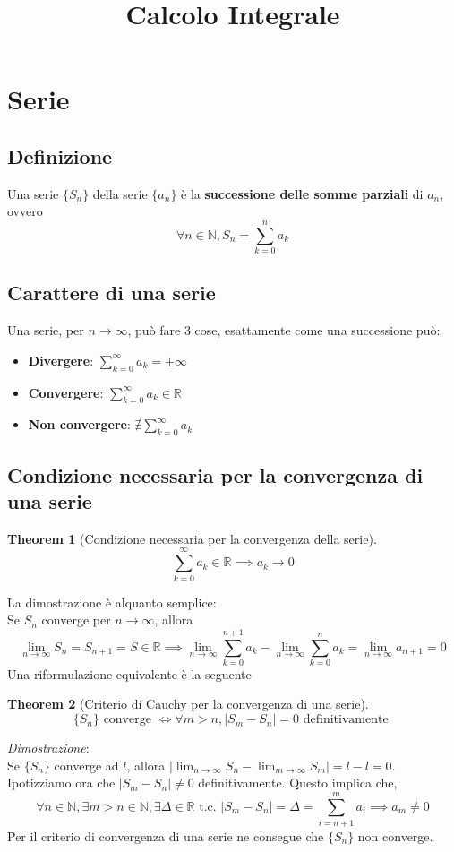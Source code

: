 \documentclass{article}
\newtheorem{theorem}{Theorem}[section]
\begin{document}
\title{Calcolo Integrale}
\maketitle
\section{Serie}
    \subsection{Definizione}
        Una serie $\{S_n\}$ della serie $\{a_n\}$ è la \textbf{successione delle somme parziali} 
        di $a_n$, ovvero 
        $$\forall n \in \mathbb{N}, S_n = \sum_{k=0}^n a_k$$
    \subsection{Carattere di una serie}
        Una serie, per $n \to \infty$, può fare 3 cose, esattamente come una successione può:
        \begin{itemize}
            \item \textbf{Divergere}: $\sum_{k=0}^\infty a_k = \pm \infty$
            \item \textbf{Convergere}: $\sum_{k=0}^\infty a_k \in \mathbb{R}$
            \item \textbf{Non convergere}: $\nexists \sum_{k=0}^\infty a_k$
        \end{itemize}
    \subsection{Condizione necessaria per la convergenza di una serie}
        \begin{theorem}[Condizione necessaria per la convergenza della serie]
            $$\sum_{k=0}^\infty a_k \in \mathbb{R} \implies a_k \to 0$$
        \end{theorem}
        La dimostrazione è alquanto semplice: \\
        Se $S_n$ converge per $n \to \infty$, allora 
        $$\lim_{n \to \infty} S_n = S_{n+1} = S \in \mathbb{R} \implies 
            \lim_{n \to \infty} \sum_{k=0}^{n+1} a_k - \lim_{n \to \infty} \sum_{k=0}^{n} a_k = 
            \lim_{n \to \infty} a_{n+1} = 0
        $$
        Una riformulazione equivalente è la seguente
        \begin{theorem}[Criterio di Cauchy per la convergenza di una serie] 
            $$\{S_n\} \textrm{ converge } \iff \forall m > n, |S_m - S_n| = 0 \textrm{ definitivamente }$$
        \end{theorem}
        \textit{Dimostrazione}: \\
            Se $\{S_n\}$ converge ad $l$, allora $|\lim_{n \to \infty} S_n - \lim_{m \to \infty} S_m| = l - l = 0$. \\
            Ipotizziamo ora che $|S_m - S_n| \neq 0$ definitivamente. Questo implica che, 
            $$\forall n \in \mathbb{N}, \exists m > n \in \mathbb{N}, \exists \Delta  \in \mathbb{R}
                \textrm{ t.c. } |S_m - S_n| = \Delta  = \sum_{i=n+1}^m a_i \implies a_m \neq 0$$
            Per il criterio di convergenza di una serie ne consegue che $\{S_n\}$ non converge.
\end{document}
